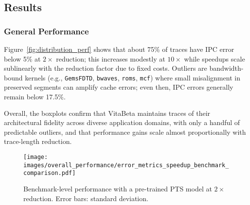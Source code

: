 \begin{figure*}[!htbp] 
    \centering
    \caption{Error distributions for $2\times$, $4\times$, and $10\times$ reductions on SPEC2006/2017, GAP, and server workloads using a pre-trained PTS model. Average speedups: $1.9\times$, $3.9\times$, $9.2\times$. \textit{\small Note: Unless stated otherwise, results in the section use an ImputeFormer pre-trained on a 10B-instruction \texttt{bfs-10} trace.}}
    \label{fig:distribution_perf}
\end{figure*}


\subsection{Results}
\subsubsection*{General Performance}
Figure~\ref{fig:distribution_perf} shows that about 75\% of traces have IPC error below 5\% at $2\times$ reduction; this increases modestly at $10\times$ while speedups scale sublinearly with the reduction factor due to fixed costs. Outliers are bandwidth-bound kernels (e.g., \texttt{GemsFDTD}, \texttt{bwaves}, \texttt{roms}, \texttt{mcf}) where small misalignment in preserved segments can amplify cache errors; even then, IPC errors generally remain below 17.5\%.

Overall, the boxplots confirm that VitaBeta maintains traces of their architectural fidelity across diverse application domains, with only a handful of predictable outliers, and that performance gains scale almost proportionally with trace-length reduction.
\begin{figure}[!htbp]
    \centering
    \setlength{\belowcaptionskip}{-10pt}
    \captionsetup{skip=3pt}
    \captionsetup[subfigure]{font=footnotesize, skip=1pt}
    \texttt{[image: images/overall\_performance/error\_metrics\_speedup\_benchmark\_comparison.pdf]}
    \caption{Benchmark-level performance with a pre-trained PTS model at $2\times$ reduction. Error bars: standard deviation.}
    \label{fig:benchmarks}
\end{figure}

